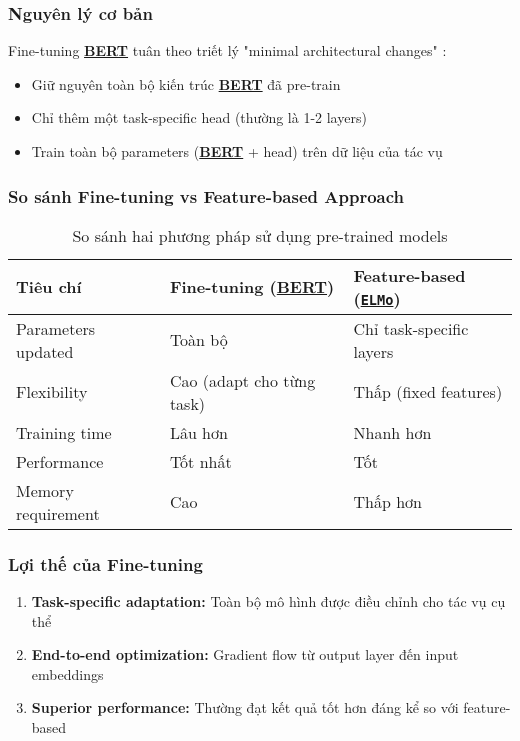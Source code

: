     \subsubsection{Nguyên lý cơ bản}
    Fine-tuning \hyperref[acro:bert]{\textbf{BERT}} tuân theo triết lý "minimal architectural changes" \cite{devlin2018bert}:
    \begin{itemize}
        \item Giữ nguyên toàn bộ kiến trúc \hyperref[acro:bert]{\textbf{BERT}} đã pre-train
        \item Chỉ thêm một task-specific head (thường là 1-2 layers)
        \item Train toàn bộ parameters (\hyperref[acro:bert]{\textbf{BERT}} + head) trên dữ liệu của tác vụ
    \end{itemize}
    
    \subsubsection{So sánh Fine-tuning vs Feature-based Approach}
    \begin{table}[H]
    \centering
    \caption{So sánh hai phương pháp sử dụng pre-trained models}
    \label{tab:finetune_vs_feature}
    \begin{tabular}{lll}
    \toprule
    \textbf{Tiêu chí} & \textbf{Fine-tuning (\hyperref[acro:bert]{\textbf{BERT}})} & \textbf{Feature-based (\hyperref[acro:elmo]{\texttt{ELMo}})} \\
    \midrule
    Parameters updated & Toàn bộ & Chỉ task-specific layers \\
    Flexibility & Cao (adapt cho từng task) & Thấp (fixed features) \\
    Training time & Lâu hơn & Nhanh hơn \\
    Performance & Tốt nhất & Tốt \\
    Memory requirement & Cao & Thấp hơn \\
    \bottomrule
    \end{tabular}
    \end{table}
    
    \subsubsection{Lợi thế của Fine-tuning}
    \begin{enumerate}
        \item \textbf{Task-specific adaptation:} Toàn bộ mô hình được điều chỉnh cho tác vụ cụ thể
        \item \textbf{End-to-end optimization:} Gradient flow từ output layer đến input embeddings
        \item \textbf{Superior performance:} Thường đạt kết quả tốt hơn đáng kể so với feature-based
    \end{enumerate}
    
